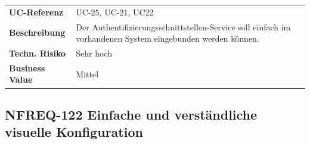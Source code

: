 \begin{longtable}[c]{@{}ll@{}}
\toprule
\begin{minipage}[t]{0.20\columnwidth}\raggedright\strut
\textbf{UC-Referenz}
\strut\end{minipage} &
\begin{minipage}[t]{0.74\columnwidth}\raggedright\strut
UC-25, UC-21, UC22
\strut\end{minipage}\tabularnewline
\begin{minipage}[t]{0.20\columnwidth}\raggedright\strut
\textbf{Beschreibung}
\strut\end{minipage} &
\begin{minipage}[t]{0.74\columnwidth}\raggedright\strut
Der Authentifizierungsschnittstellen-Service soll einfach im vorhandenen
System eingebunden werden können.
\strut\end{minipage}\tabularnewline
\begin{minipage}[t]{0.20\columnwidth}\raggedright\strut
\textbf{Techn. Risiko}
\strut\end{minipage} &
\begin{minipage}[t]{0.74\columnwidth}\raggedright\strut
Sehr hoch
\strut\end{minipage}\tabularnewline
\begin{minipage}[t]{0.20\columnwidth}\raggedright\strut
\textbf{Business Value}
\strut\end{minipage} &
\begin{minipage}[t]{0.74\columnwidth}\raggedright\strut
Mittel
\strut\end{minipage}\tabularnewline
\bottomrule
\end{longtable}

\subsection{NFREQ-122 Einfache und verständliche visuelle
Konfiguration}\label{nfreq-122-einfache-und-verstuxe4ndliche-visuelle-konfiguration}

